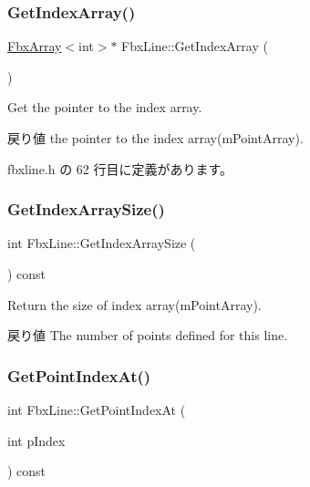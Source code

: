 \subsubsection{\texorpdfstring{Get\+Index\+Array()}{GetIndexArray()}}
{\footnotesize\ttfamily \hyperlink{class_fbx_array}{Fbx\+Array}$<$int$>$$\ast$ Fbx\+Line\+::\+Get\+Index\+Array (\begin{DoxyParamCaption}{ }\end{DoxyParamCaption})\hspace{0.3cm}{\ttfamily [inline]}}

Get the pointer to the index array. \begin{DoxyReturn}{戻り値}
the pointer to the index array(m\+Point\+Array). 
\end{DoxyReturn}


 fbxline.\+h の 62 行目に定義があります。

\mbox{\label{class_fbx_line_a8055b3ec4b3dde0a73681716a33c77f5}} 
\subsubsection{\texorpdfstring{Get\+Index\+Array\+Size()}{GetIndexArraySize()}}
{\footnotesize\ttfamily int Fbx\+Line\+::\+Get\+Index\+Array\+Size (\begin{DoxyParamCaption}{ }\end{DoxyParamCaption}) const}

Return the size of index array(m\+Point\+Array). \begin{DoxyReturn}{戻り値}
The number of points defined for this line. 
\end{DoxyReturn}
\mbox{\label{class_fbx_line_a6ff2971e12ada06a4e724b97d149a875}} 
\subsubsection{\texorpdfstring{Get\+Point\+Index\+At()}{GetPointIndexAt()}}
{\footnotesize\ttfamily int Fbx\+Line\+::\+Get\+Point\+Index\+At (\begin{DoxyParamCaption}\item[{int}]{p\+Index }\end{DoxyParamCaption}) const}

